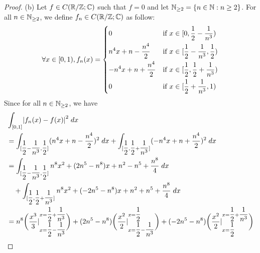 \begin{proof}{(b)}
  Let \(f \in C(\mathbb{R} / \mathbb{Z} ; \mathbb{C})\) such that \(f = 0\) and let \(\mathbb{N}_{\geq 2} = \left\lbrace n \in \mathbb{N} : n \geq 2\right\rbrace\).
  For all \(n \in \mathbb{N}_{\geq 2}\), we define \(f_n \in C(\mathbb{R} / \mathbb{Z} ; \mathbb{C})\) as follow:
  \[
    \forall x \in [0, 1), f_n(x) = \begin{dcases}
      0                           & \text{if } x \in [0, \dfrac{1}{2} - \dfrac{1}{n^3})            \\
      n^4 x + n - \dfrac{n^4}{2}  & \text{if } x \in [\dfrac{1}{2} - \dfrac{1}{n^3}, \dfrac{1}{2}) \\
      -n^4 x + n + \dfrac{n^4}{2} & \text{if } x \in [\dfrac{1}{2}, \dfrac{1}{2} + \dfrac{1}{n^3}) \\
      0                           & \text{if } x \in [\dfrac{1}{2} + \dfrac{1}{n^3}, 1)
    \end{dcases}
  \]
  Since for all \(n \in \mathbb{N}_{\geq 2}\), we have
  \begin{align*}
     & \int_{[0, 1]} \abs{f_n(x) - f(x)}^2 \; dx                                                                                                                                                                                                                                                                      \\
     & = \int_{[\dfrac{1}{2} - \dfrac{1}{n^3}, \dfrac{1}{2}]} (n^4 x + n - \dfrac{n^4}{2})^2 \; dx + \int_{[\dfrac{1}{2}, \dfrac{1}{2} + \dfrac{1}{n^3}]} (-n^4 x + n + \dfrac{n^4}{2})^2 \; dx                                                                                                                       \\
     & = \int_{[\dfrac{1}{2} - \dfrac{1}{n^3}, \dfrac{1}{2}]} n^8 x^2 + (2n^5 - n^8) x + n^2 - n^5 + \dfrac{n^8}{4} \; dx                                                                                                                                                                                             \\
     & \quad + \int_{[\dfrac{1}{2}, \dfrac{1}{2} + \dfrac{1}{n^3}]} n^8 x^2 + (-2n^5 - n^8) x + n^2 + n^5 + \dfrac{n^8}{4} \; dx                                                                                                                                                                                      \\
     & = n^8 \bigg(\dfrac{x^3}{3}|_{x = \dfrac{1}{2} - \dfrac{1}{n^3}}^{x = \dfrac{1}{2} + \dfrac{1}{n^3}}\bigg) + (2n^5 - n^8) \bigg(\dfrac{x^2}{2}|_{x = \dfrac{1}{2} - \dfrac{1}{n^3}}^{x = \dfrac{1}{2}}\bigg) + (-2n^5 - n^8) \bigg(\dfrac{x^2}{2}|_{x = \dfrac{1}{2}}^{x = \dfrac{1}{2} + \dfrac{1}{n^3}}\bigg) \\

\end{align*}
\end{proof}

